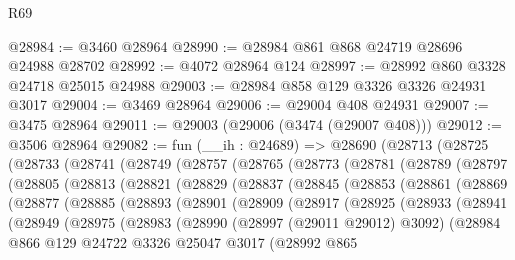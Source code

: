 \begin{lexlean}{R69}
\begin{coremodule}
@28984 := @3460 @28964
@28990 := @28984 @861 @868 @24719 @28696 @24988 @28702
@28992 := @4072 @28964 @124
@28997 := @28992 @860 @3328 @24718 @25015 @24988
@29003 := @28984 @858 @129 @3326 @3326 @24931 @3017
@29004 := @3469 @28964
@29006 := @29004 @408 @24931
@29007 := @3475 @28964
@29011 := @29003 (@29006 (@3474 (@29007 @408)))
@29012 := @3506 @28964
@29082 := fun (__ih : @24689) =>
  @28690
    (@28713
      (@28725
        (@28733
          (@28741
            (@28749
              (@28757
                (@28765
                  (@28773
                    (@28781
                      (@28789
                        (@28797
                          (@28805
                            (@28813
                              (@28821
                                (@28829
                                  (@28837
                                    (@28845
                                      (@28853
                                        (@28861
                                          (@28869
                                            (@28877
                                              (@28885
                                                (@28893
                                                  (@28901
                                                    (@28909
                                                      (@28917
                                                        (@28925
                                                          (@28933
                                                            (@28941
                                                              (@28949
                                                                (@28975
                                                                  (@28983
                                                                    (@28990
                                                                      (@28997 (@29011 @29012) @3092)
                                                                      (@28984
                                                                        @866
                                                                        @129
                                                                        @24722
                                                                        @3326
                                                                        @25047
                                                                        @3017
                                                                        (@28992
                                                                          @865

\end{coremodule}
\end{lexlean}
